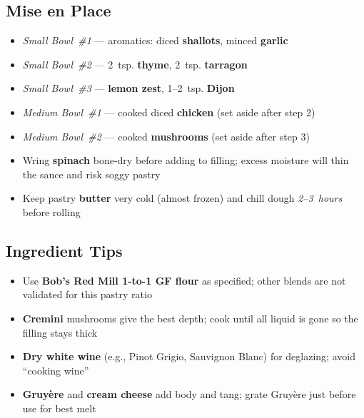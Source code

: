 \documentclass[11pt,letterpaper]{article}
\begin{document}
\subsection*{Mise en Place}
\begin{itemize}
    \item \textit{Small Bowl~\#1} --- aromatics: diced \textbf{shallots}, minced \textbf{garlic}
    \item \textit{Small Bowl~\#2} --- 2~tsp. \textbf{thyme}, 2~tsp. \textbf{tarragon}
    \item \textit{Small Bowl~\#3} --- \textbf{lemon zest}, 1--2~tsp. \textbf{Dijon}
    \item \textit{Medium Bowl~\#1} --- cooked diced \textbf{chicken} (set aside after step 2)
    \item \textit{Medium Bowl~\#2} --- cooked \textbf{mushrooms} (set aside after step 3)
    \item Wring \textbf{spinach} bone-dry before adding to filling; excess moisture will thin the sauce and risk soggy pastry
    \item Keep pastry \textbf{butter} very cold (almost frozen) and chill dough \textit{2--3~hours} before rolling
\end{itemize}

\subsection*{Ingredient Tips}
\begin{itemize}
    \item Use \textbf{Bob's Red Mill 1-to-1 GF flour} as specified; other blends are not validated for this pastry ratio
    \item \textbf{Cremini} mushrooms give the best depth; cook until all liquid is gone so the filling stays thick
    \item \textbf{Dry white wine} (e.g., Pinot Grigio, Sauvignon Blanc) for deglazing; avoid ``cooking wine''
    \item \textbf{Gruyère} and \textbf{cream cheese} add body and tang; grate Gruyère just before use for best melt
\end{itemize}
\end{document}

